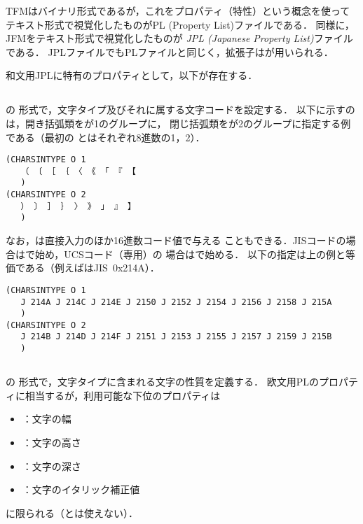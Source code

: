\documentclass[a4paper,11pt,nomag]{jsarticle}
\begin{document}
TFMはバイナリ形式であるが，これをプロパティ（特性）という概念を使って
テキスト形式で視覚化したものがPL (Property List)ファイルである．
同様に，JFMをテキスト形式で視覚化したものが
\emph{JPL (Japanese Property List)}ファイルである．
JPLファイルでもPLファイルと同じく，拡張子はが用いられる．

和文用JPLに特有のプロパティとして，以下が存在する．

\subsection{}
の
形式で，文字タイプ及びそれに属する文字コードを設定する．
以下に示すのは，開き括弧類をが1のグループに，
閉じ括弧類をが2のグループに指定する例である（最初の
とはそれぞれ8進数の1，2）．
\begin{verbatim}
(CHARSINTYPE O 1
   （ 〔 ［ ｛ 〈 《 「 『 【
   )
(CHARSINTYPE O 2
   ） 〕 ］ ｝ 〉 》 」 』 】
   )
\end{verbatim}

なお，は直接入力のほか16進数コード値で与える
こともできる．JISコードの場合はで始め，UCSコード（\upTeX 専用）の
場合はで始める．
以下の指定は上の例と等価である（例えばはJIS~0x214A）．
\begin{verbatim}
(CHARSINTYPE O 1
   J 214A J 214C J 214E J 2150 J 2152 J 2154 J 2156 J 2158 J 215A
   )
(CHARSINTYPE O 2
   J 214B J 214D J 214F J 2151 J 2153 J 2155 J 2157 J 2159 J 215B
   )
\end{verbatim}

\subsection{}
の
形式で，文字タイプに含まれる文字の性質を定義する．
欧文用PLのプロパティに相当するが，利用可能な下位のプロパティは
\begin{itemize}
 \item {}：文字の幅
 \item {}：文字の高さ
 \item {}：文字の深さ
 \item {}：文字のイタリック補正値
\end{itemize}
に限られる（とは使えない）．
\end{document}
